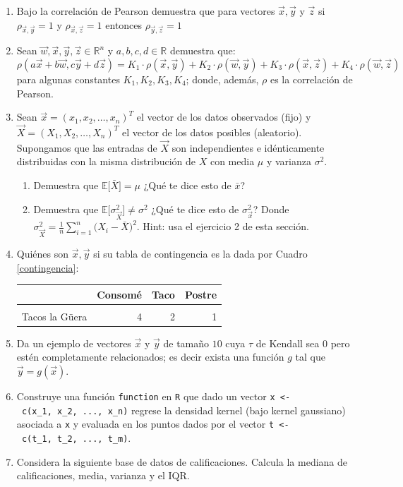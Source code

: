 \documentclass[
]{book}
\providecommand{\tightlist}{%
  \setlength{\itemsep}{0pt}\setlength{\parskip}{0pt}}
\begin{document}
\begin{enumerate}
\item
  Bajo la correlación de Pearson demuestra que para vectores \(\vec{x}, \vec{y}\) y \(\vec{z}\) si \(\rho_{\vec{x},\vec{y}} = 1\) y \(\rho_{\vec{x},\vec{z}} = 1\) entonces \(\rho_{\vec{y},\vec{z}} = 1\)
\item
  Sean \(\vec{w}, \vec{x}, \vec{y}, \vec{z} \in\mathbb{R}^n\) y \(a,b,c,d\in\mathbb{R}\) demuestra que:
  \[
  \rho(a \vec{x} + b \vec{w}, c \vec{y} + d \vec{z}) = K_1\cdot\rho(\vec{x}, \vec{y}) + K_2\cdot\rho(\vec{w}, \vec{y}) + K_3\cdot\rho(\vec{x}, \vec{z}) + K_4\cdot\rho(\vec{w}, \vec{z}) 
  \]
  para algunas constantes \(K_1, K_2, K_3, K_4\); donde, además, \(\rho\) es la correlación de Pearson.
\item
  Sean \(\vec{x} = (x_1,x_2, \dots, x_n)^T\) el vector de los datos observados (fijo) y \(\vec{X} = (X_1,X_2, \dots, X_n)^T\) el vector de los datos posibles (aleatorio). Supongamos que las entradas de \(\vec{X}\) son independientes e idénticamente distribuidas con la misma distribución de \(X\) con media \(\mu\) y varianza \(\sigma^2\).

  \begin{enumerate}
  \def\labelenumii{\alph{enumii}.}
  \tightlist
  \item
    Demuestra que \(\mathbb{E}\big[ \bar{X} \big] = \mu\) ¿Qué te dice esto de \(\bar{x}\)?
  \item
    Demuestra que \(\mathbb{E}\big[ \sigma_{\vec{X}}^2 \big] \neq \sigma^2\) ¿Qué te dice esto de \(\sigma_{\vec{x}}^2\)?
    Donde \(\sigma_{\vec{X}}^2 = \frac{1}{n}\sum_{i=1}^n \big( X_i - \bar{X}\big)^2\). Hint: usa el ejercicio 2 de esta sección.
  \end{enumerate}
\item
  Quiénes son \(\vec{x}, \vec{y}\) si su tabla de contingencia es la dada por Cuadro \ref{contingencia}:

  \begin{table}
  \centering
  \begin{tabular}{l|r|r|r}
  \hline
    & Consomé & Taco & Postre\\
  \hline
  \cellcolor{gray!6}{Tacos el Güero} & \cellcolor{gray!6}{1} & \cellcolor{gray!6}{3} & \cellcolor{gray!6}{2}\\
  \hline
  Tacos la Güera & 4 & 2 & 1\\
  \hline
  \end{tabular}
  \end{table}
\item
  Da un ejemplo de vectores \(\vec{x}\) y \(\vec{y}\) de tamaño \(10\) cuya \(\tau\) de Kendall sea \(0\) pero estén completamente relacionados; es decir exista una función \(g\) tal que \(\vec{y} = g(\vec{x})\).
\item
  Construye una función \texttt{function} en \texttt{R} que dado un vector \texttt{x\ \textless{}-\ c(x\_1,\ x\_2,\ ...,\ x\_n)} regrese la densidad kernel (bajo kernel gaussiano) asociada a \texttt{x} y evaluada en los puntos dados por el vector \texttt{t\ \textless{}-\ c(t\_1,\ t\_2,\ ...,\ t\_m)}.
\item
  Considera la siguiente base de datos de calificaciones. Calcula la mediana de calificaciones, media, varianza y el IQR.
\end{enumerate}
\end{document}
